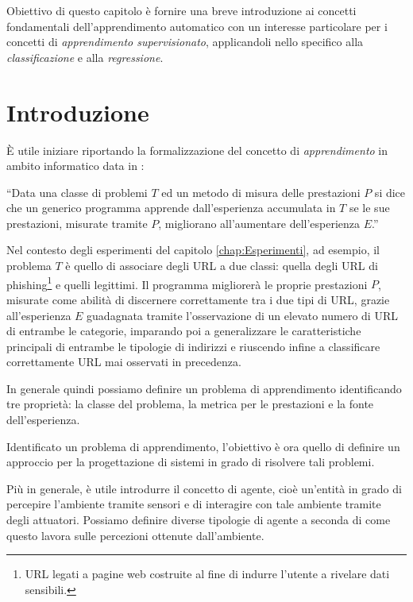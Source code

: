 \documentclass[../../main.tex]{subfiles}
\begin{document}
    Obiettivo di questo capitolo è fornire una breve introduzione ai concetti fondamentali dell'apprendimento automatico con un interesse particolare per i concetti di \textit{apprendimento supervisionato}, applicandoli nello specifico alla \textit{classificazione} e alla \textit{regressione}.

    \section{Introduzione}

    È utile iniziare riportando la formalizzazione del concetto di \textit{apprendimento} in ambito informatico data in \cite{Mitchell97}:
    
    ``Data una classe di problemi $T$ ed un metodo di misura delle prestazioni $P$ si dice che un generico programma apprende dall'esperienza accumulata in $T$ se le sue prestazioni, misurate tramite $P$, migliorano all'aumentare dell'esperienza $E$.'' 

    Nel contesto degli esperimenti del capitolo \ref{chap:Esperimenti}, ad esempio, il problema $T$ è quello di associare degli URL a due classi: quella degli URL di phishing\footnote{URL legati a pagine web costruite al fine di indurre l'utente a rivelare dati sensibili.} e quelli legittimi. Il programma migliorerà le proprie prestazioni $P$, misurate come abilità di discernere correttamente tra i due tipi di URL, grazie all'esperienza  $E$ guadagnata tramite l'osservazione di un elevato numero di URL di entrambe le categorie, imparando poi a generalizzare le caratteristiche principali di entrambe le tipologie di indirizzi e riuscendo infine a classificare correttamente  URL mai osservati in precedenza.

    In generale quindi possiamo definire un problema di apprendimento identificando tre proprietà: la classe del problema, la metrica per le prestazioni e la fonte dell'esperienza.

    Identificato un problema di apprendimento, l'obiettivo è ora quello di definire un approccio per la progettazione di sistemi in grado di risolvere tali problemi.

    Più in generale, è utile introdurre il concetto di agente, cioè un'entità in grado di percepire l'ambiente tramite sensori e di interagire con tale ambiente tramite degli attuatori. Possiamo definire diverse tipologie di agente a seconda di come questo lavora sulle percezioni ottenute dall'ambiente.
\end{document}
